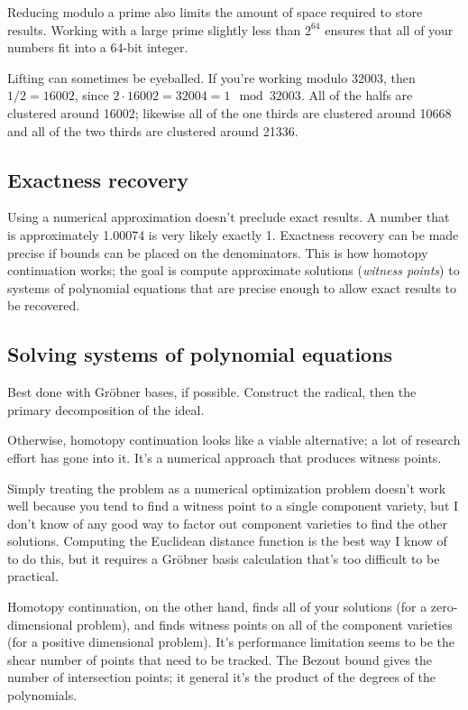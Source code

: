 \documentclass{article}
\begin{document}
Reducing modulo a prime also limits the amount of space required to store
results.  Working with a large prime slightly less than $2^{64}$ ensures that
all of your numbers fit into a 64-bit integer.

Lifting can sometimes be eyeballed.  If you're working modulo 32003, then
$1/2 = 16002$, since $2\cdot 16002 = 32004 = 1 \mod 32003$.  All of the
halfs are clustered around 16002; likewise all of the one thirds are clustered
around 10668 and all of the two thirds are clustered around 21336.

\subsection*{Exactness recovery}

Using a numerical approximation doesn't preclude exact results.  A number that
is approximately 1.00074 is very likely exactly 1.  Exactness recovery can be
made precise if bounds can be placed on the denominators.  This is how
homotopy continuation works; the goal is compute approximate solutions
({\it witness points}) to systems of polynomial equations
that are precise enough to allow exact results
to be recovered.

\subsection*{Solving systems of polynomial equations}

Best done with Gr\"obner bases, if possible.  Construct the radical,
then the primary decomposition of the ideal.

Otherwise, homotopy continuation looks like a viable alternative;
a lot of research effort has gone into it.  It's a numerical approach
that produces witness points.

Simply treating the problem as a numerical optimization problem
doesn't work well because you tend to find a witness point to
a single component variety, but I don't know of any good way
to factor out component varieties to find the other solutions.
Computing the Euclidean distance function is the best way I
know of to do this, but it requires a Gr\"obner basis calculation
that's too difficult to be practical.

Homotopy continuation, on the other hand, finds all of your solutions (for a zero-dimensional problem),
and finds witness points on all of the component varieties (for a positive dimensional problem).
It's performance limitation seems to be the shear number of points
that need to be tracked.  The Bezout bound gives the number of intersection
points; it general it's the product of the degrees of the polynomials.
\end{document}
